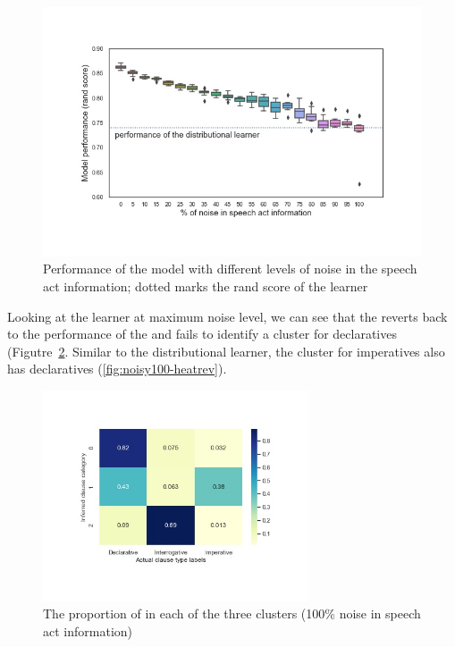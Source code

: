 \begin{figure}[H]
    \centering
    \includegraphics[width=1\textwidth]{figures/noisy-rand-compare.jpg}
    \caption{Performance of the \plearnerabbr{} model with different levels of noise in the speech act information; dotted marks the rand score of the \dlearnerabbr{} learner}
    \label{fig:man-noisy-rand-compare}
\end{figure}


Looking at the learner at maximum noise level, we can see that the \plearnerabbr{} reverts back to the performance of the \dlearnerabbr{} and fails to identify a cluster for declaratives (Figutre~\ref{fig:noisy100-heatmap}. Similar to the distributional learner, the cluster for imperatives also has declaratives (\ref{fig:noisy100-heatrev}). 



\begin{figure}[H]
    \centering
    \includegraphics[width=0.7\textwidth]{figures/noisy100-heatmap.jpg}
    \caption{The proportion of \diis{} in each of the three clusters (100\% noise in speech act information) }
    \label{fig:noisy100-heatmap}
\end{figure}

